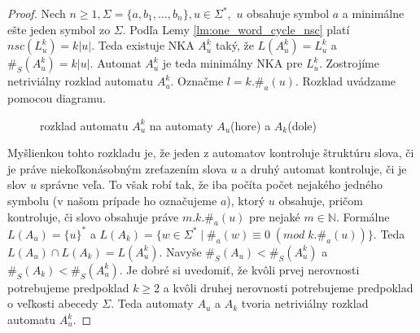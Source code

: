 \begin{proof}
Nech $ n \geq 1, \Sigma = \lbrace a, b_1, \ldots , b_n \rbrace, u \in \Sigma^*,$ $ u $ obsahuje symbol $ a $ a minimálne ešte jeden symbol zo $ \Sigma $. Podľa Lemy \ref{lm:one_word_cycle_nsc} platí $ nsc(L_u^k) = k|u| $. Teda existuje NKA $ A_u^k $ taký, že $ L(A_u^k) = L_u^k $ a $ \#_S(A_u^k) = k|u| $. Automat $ A_u^k $ je teda minimálny NKA pre $ L_u^k $. Zostrojíme netriviálny rozklad automatu $ A_u^k $. Označme $ l = k.\#_a(u) $. Rozklad uvádzame pomocou diagramu.

\begin{figure}[H]
\centering
{}


\caption{rozklad automatu $ A_u^k $ na automaty $ A_u $(hore) a $ A_k $(dole)}
\end{figure}

Myšlienkou tohto rozkladu je, že jeden z automatov kontroluje štruktúru slova, či je práve niekoľkonásobným zreťazením slova $ u $ a druhý automat kontroluje, či je slov $ u $ správne veľa. To však robí tak, že iba počíta počet nejakého jedného symbolu (v našom prípade ho označujeme $ a $), ktorý $ u $ obsahuje, pričom kontroluje, či slovo obsahuje práve $ m.k.\#_a(u) $ pre nejaké $ m \in \mathbb{N} $. Formálne $ L(A_u) = \lbrace u \rbrace^* $ a $ L(A_k) = \lbrace w \in \Sigma^* \; | \; \#_a(w) \equiv 0 \; (mod \; k.\#_a(u)) \rbrace $. Teda $ L(A_u) \cap L(A_k) = L(A_u^k) $. Navyše $ \#_S(A_u) < \#_S(A_u^k) $ a $ \#_S(A_k) < \#_S(A_u^k) $. Je dobré si uvedomiť, že kvôli prvej nerovnosti potrebujeme predpoklad $ k \geq 2 $ a kvôli druhej nerovnosti potrebujeme predpoklad o veľkosti abecedy $ \Sigma $. Teda automaty $ A_u $ a $ A_k $ tvoria netriviálny rozklad automatu $ A_u^k $.

\end{proof}


